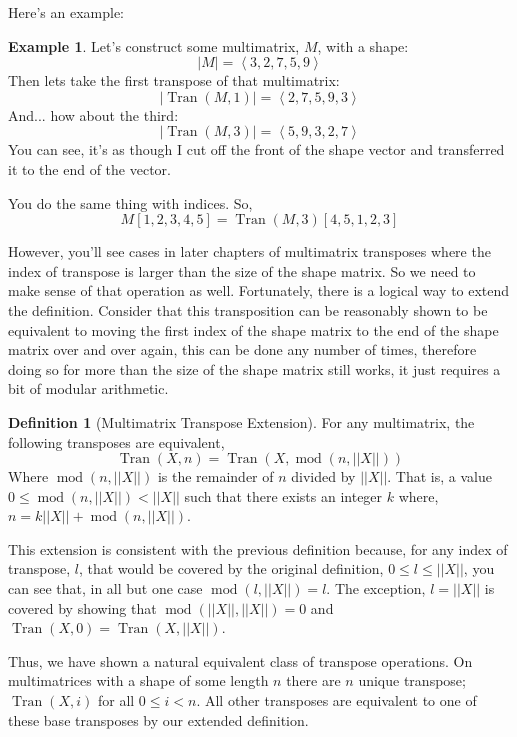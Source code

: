 \documentclass[12pt]{book}
\theoremstyle{plain}
\theoremstyle{definition}
\newtheorem{definition}{Definition}[chapter]
\newtheorem{example}{Example}[chapter]
\theoremstyle{ppart}
\theoremstyle{case}
\theoremstyle{solution}
\DeclareMathOperator{\Tran}{Tran}
\DeclareMathOperator{\remainder}{mod}
\newcommand{\shape}[1]{\left|#1\right|}
\begin{document}
Here's an example:

\begin{example}
Let's construct some multimatrix, $M$, with a shape:
\[ \shape{M} = \left<3,2,7,5,9\right> \]
Then lets take the first transpose of that
multimatrix:
\[ \shape{\Tran(M, 1)} = \left<2,7,5,9,3\right> \]
And... how about the third:
\[ \shape{\Tran(M, 3)} = \left<5,9,3,2,7\right> \]
You can see, it's as though I cut off the front of the shape vector and transferred
it to the end of the vector.

You do the same thing with indices. So,
\[ M[1,2,3,4,5] = \Tran(M, 3)[4,5,1,2,3] \]
\end{example}

However, you'll see cases in later chapters of multimatrix transposes where
the index of transpose is larger than the size of the shape matrix. So we need
to make sense of that operation as well. Fortunately, there is a logical way
to extend the definition. Consider that this transposition can be reasonably
shown to be equivalent to moving the first index of the shape matrix
to the end of the shape matrix over and over again, this can be done any number
of times, therefore doing so for more than the size of the shape matrix still works,
it just requires a bit of modular arithmetic.

\begin{definition}[Multimatrix Transpose Extension]
\label{tran_ext}
For any multimatrix, the following transposes are equivalent,
\[ \Tran(X, n) = \Tran(X, \remainder(n, \shape{\shape{X}})) \]
Where $\remainder(n, \shape{\shape{X}})$ is the remainder of $n$ divided by $\shape{\shape{X}}$.
That is, a value $0 \le \remainder(n, \shape{\shape{X}}) < \shape{\shape{X}}$ such that there exists an
integer $k$ where, $n = k\shape{\shape{X}} + \remainder(n, \shape{\shape{X}})$.
\end{definition}

This extension is consistent with the previous definition because, for any
index of transpose, $l$, that would be covered by the original definition,
$0 \le l \le \shape{\shape{X}}$, you can see that, in all but one case $\remainder(l, \shape{\shape{X}}) = l$.
The exception, $l = \shape{\shape{X}}$ is covered by showing that
$\remainder(\shape{\shape{X}}, \shape{\shape{X}}) = 0$ and $\Tran(X, 0) = \Tran(X, \shape{\shape{X}})$. 

Thus, we have shown a natural equivalent class \cite{book:abstract} of transpose
operations. On multimatrices with a shape of some length $n$ there are $n$ unique
transpose; $\Tran(X, i)$ for all $0 \le i < n$. All other transposes are equivalent
to one of these base transposes by our extended definition.
\end{document}

